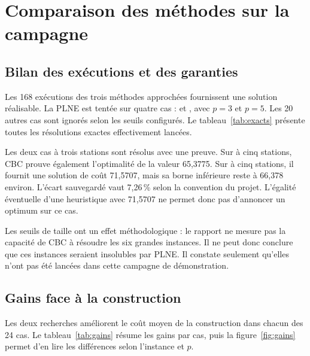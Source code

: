 \chapter{Comparaison des méthodes sur la campagne}
\section{Bilan des exécutions et des garanties}
Les 168 exécutions des trois méthodes approchées fournissent une solution
réalisable. La PLNE est tentée sur quatre cas :  et
, avec $p=3$ et $p=5$. Les 20 autres cas sont ignorés selon
les seuils configurés. Le tableau~\ref{tab:exacts} présente toutes les
résolutions exactes effectivement lancées.

\begin{table}[htbp]\centering
{\small\setlength{\tabcolsep}{3.5pt}}
\caption{Solutions PLNE, bornes et statut de preuve, sous une limite CBC de cinq secondes.}
\label{tab:exacts}
\end{table}

Les deux cas à trois stations sont résolus avec une preuve. Sur
 à cinq stations, CBC prouve également l'optimalité de la
valeur 65,3775. Sur  à cinq stations, il fournit une solution
de coût 71,5707, mais sa borne inférieure reste à 66,378 environ.
L'écart sauvegardé vaut 7,26\,\% selon la convention du projet. L'égalité
éventuelle d'une heuristique avec 71,5707 ne permet donc pas d'annoncer
un optimum sur ce cas.

Les seuils de taille ont un effet méthodologique : le rapport ne mesure pas
la capacité de CBC à résoudre les six grandes instances. Il ne peut donc
conclure que ces instances seraient insolubles par PLNE. Il constate seulement
qu'elles n'ont pas été lancées dans cette campagne de démonstration.

\section{Gains face à la construction}
Les deux recherches améliorent le coût moyen de la construction dans chacun
des 24 cas. Le tableau~\ref{tab:gains} résume les gains par cas, puis la
figure~\ref{fig:gains} permet d'en lire les différences selon l'instance et $p$.
\begin{table}[htbp]\centering

\caption{Distribution descriptive des 24 gains moyens face à la construction, à $\alpha=1$.}
\label{tab:gains}\sourcetable
\end{table}

